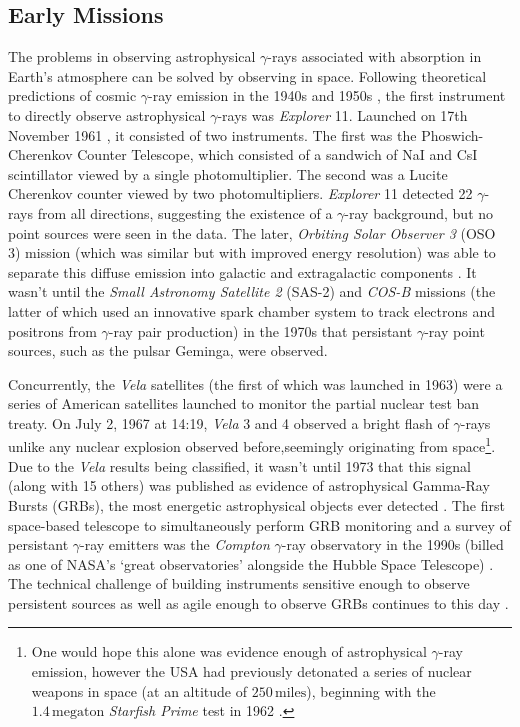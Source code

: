 \subsection{Early Missions}
The problems in observing astrophysical $\gamma$-rays associated with absorption in Earth's atmosphere can be solved by observing in space. Following theoretical predictions of cosmic $\gamma$-ray emission in the 1940s and 1950s \cite{morrison}, the first instrument to directly observe astrophysical $\gamma$-rays was \textit{Explorer} 11. Launched on 17th November 1961 \cite{explorer}, it consisted of two instruments. The first was the Phoswich-Cherenkov Counter Telescope, which consisted of a sandwich of NaI and CsI scintillator viewed by a single photomultiplier. The second was a  Lucite Cherenkov counter viewed by two photomultipliers. \textit{Explorer} 11 detected 22 $\gamma$-rays from all directions, suggesting the existence of a $\gamma$-ray background, but no point sources were seen in the data. The later, \textit{Orbiting Solar Observer 3} (OSO 3) mission (which was similar but with improved energy resolution) was able to separate this diffuse emission into galactic and extragalactic components \cite{oso3}. It wasn't until the \textit{Small Astronomy Satellite 2} (SAS-2) \cite{sas2} and \textit{COS-B} \cite{cosb} missions (the latter of which used an innovative spark chamber system to track electrons and positrons from $\gamma$-ray pair production) in the 1970s that persistant $\gamma$-ray point sources, such as the pulsar Geminga, were observed.

Concurrently, the \textit{Vela} satellites (the first of which was launched in 1963) were a series of American satellites launched to monitor the partial nuclear test ban treaty. On July 2, 1967 at 14:19, \textit{Vela} 3 and 4 observed a bright flash of $\gamma$-rays unlike any nuclear explosion observed before,seemingly originating from space\footnote{One would hope this alone was evidence enough of astrophysical $\gamma$-ray emission, however the USA had previously detonated a series of nuclear weapons in space (at an altitude of $\mathrm{250\,miles}$), beginning with the $\mathrm{1.4\,megaton}$ \textit{Starfish Prime} test in 1962 \cite{starfish}.}. Due to the \textit{Vela} results being classified, it wasn't until 1973 that this signal (along with 15 others) was published as evidence of astrophysical Gamma-Ray Bursts (GRBs), the most energetic astrophysical objects ever detected \cite{velagrb}. The first space-based telescope to simultaneously perform GRB monitoring and a survey of persistant $\gamma$-ray emitters was the \textit{Compton} $\gamma$-ray observatory in the 1990s (billed as one of NASA's `great observatories' alongside the Hubble Space Telescope) \cite{compton}. The technical challenge of building instruments sensitive enough to observe persistent sources as well as agile enough to observe GRBs continues to this day \cite{magicGRB}.

